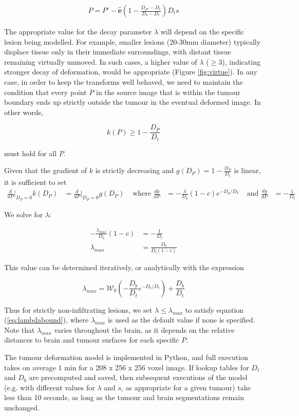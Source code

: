 \begin{align}
  P = P' - \mathbf{\hat{e}}(1-\frac{D_{P'}-D_t}{D_b-D_t})D_ts
\end{align}

The appropriate value for the decay parameter $\lambda$ will depend on the specific lesion being modelled. For example, smaller lesions (20-30mm diameter) typically displace tissue only in their immediate surroundings, with distant tissue remaining virtually unmoved. In such cases, a higher value of $\lambda$ ($\geq 3$), indicating stronger decay of deformation, would be appropriate (Figure \ref{fig:virtue}).
In any case, in order to keep the transforms well behaved, we need to maintain the condition that every point $P$ in the source image that is within the tumour boundary ends up strictly outside the tumour in the eventual deformed image.
In other words,

\begin{equation}\label{eq:lambdabound}
  k(P) \geq 1 - \frac{D_P}{D_t}
\end{equation}

must hold for all $P$.

Given that the gradient of $k$ is strictly decreasing and $g(D_P) = 1 - \frac{D_P}{D_t}$ is linear, it is sufficient to set
\begin{align*}
  \frac{d}{dP}\bigg\rvert_{D_P=0}k(D_P) &= \frac{d}{dP}\bigg\rvert_{D_P=0}g(D_P) &\text{ where } \frac{dk}{dP} &= -\frac{\lambda}{D_b}(1-c)e^{-D_p/D_b} &\text{ and } \frac{dg}{dP} &= -\frac{1}{D_t}
\end{align*}

We solve for $\lambda$:

\begin{align*}
  -\frac{\lambda_{max}}{D_b}(1-c) &= -\frac{1}{D_t} \\
  \lambda_{max} &= \frac{D_b}{D_t (1-c)}
\end{align*}

This value can be determined iteratively, or analytically with the expression

\begin{equation}
  \lambda_{max} = \mathcal{W}_0(-\frac{D_b}{D_t}e^{-D_b/D_t})+\frac{D_b}{D_t}
\end{equation}

Thus for strictly non-infiltrating lesions, we set $\lambda \leq \lambda_{max}$ to satisfy equation (\ref{eq:lambdabound}), where $\lambda_{max}$ is used as the default value if none is specified. Note that $\lambda_{max}$ varies throughout the brain, as it depends on the relative distances to brain and tumour surfaces for each specific $P$.

The tumour deformation model is implemented in Python, and full execution takes on average 1 min for a 208 x 256 x 256 voxel image.
If lookup tables for $ D_t$ and $D_b$ are precomputed and saved, then subsequent executions of the model (e.g. with different values for $\lambda$ and $s$, as appropriate for a given tumour) take less than 10 seconds, as long as the tumour and brain segmentations remain unchanged.

